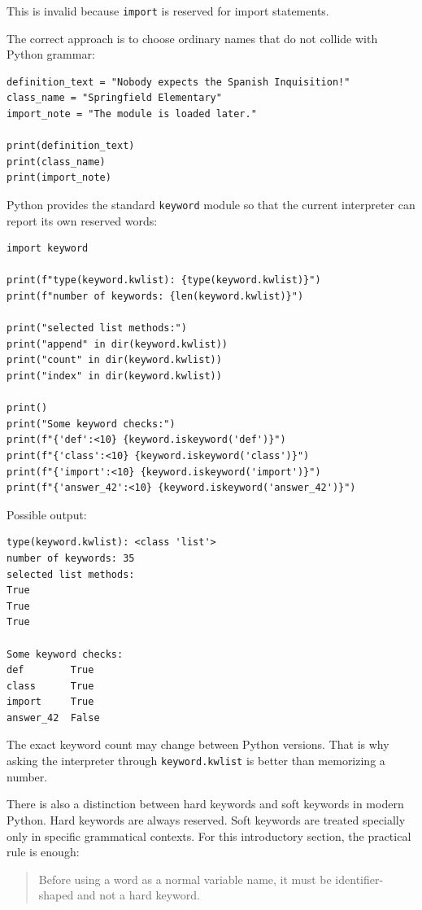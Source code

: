 This is invalid because \texttt{import} is reserved for import statements.

The correct approach is to choose ordinary names that do not collide with Python grammar:

\begin{verbatim}
definition_text = "Nobody expects the Spanish Inquisition!"
class_name = "Springfield Elementary"
import_note = "The module is loaded later."

print(definition_text)
print(class_name)
print(import_note)
\end{verbatim}

Python provides the standard \texttt{keyword} module so that the current interpreter can report its own reserved words:

\begin{verbatim}
import keyword

print(f"type(keyword.kwlist): {type(keyword.kwlist)}")
print(f"number of keywords: {len(keyword.kwlist)}")

print("selected list methods:")
print("append" in dir(keyword.kwlist))
print("count" in dir(keyword.kwlist))
print("index" in dir(keyword.kwlist))

print()
print("Some keyword checks:")
print(f"{'def':<10} {keyword.iskeyword('def')}")
print(f"{'class':<10} {keyword.iskeyword('class')}")
print(f"{'import':<10} {keyword.iskeyword('import')}")
print(f"{'answer_42':<10} {keyword.iskeyword('answer_42')}")
\end{verbatim}

Possible output:

\begin{verbatim}
type(keyword.kwlist): <class 'list'>
number of keywords: 35
selected list methods:
True
True
True

Some keyword checks:
def        True
class      True
import     True
answer_42  False
\end{verbatim}

The exact keyword count may change between Python versions. That is why asking the interpreter through \texttt{keyword.kwlist} is better than memorizing a number.

There is also a distinction between hard keywords and soft keywords in modern Python. Hard keywords are always reserved. Soft keywords are treated specially only in specific grammatical contexts. For this introductory section, the practical rule is enough:

\begin{quote}
Before using a word as a normal variable name, it must be identifier-shaped and not a hard keyword.
\end{quote}

